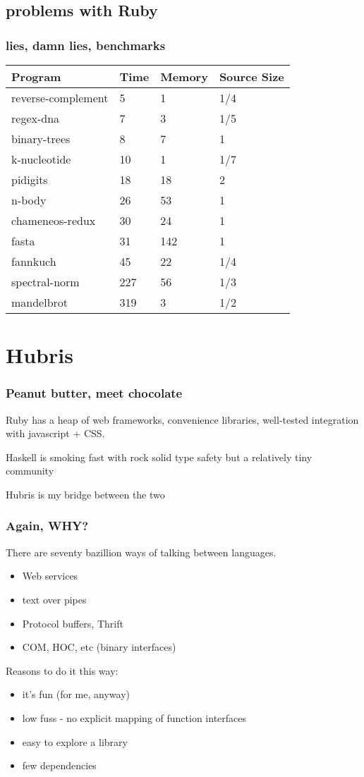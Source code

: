 \documentclass{beamer}
\begin{document}
\subsection{problems with Ruby}
\begin{frame}
  \frametitle{lies, damn lies, benchmarks}
  \begin{tabular}{l l l l}
    Program &	        Time	&Memory &	Source Size\\ \hline
    reverse-complement	&5	&1	&1/4\\
    regex-dna	        &7	&3	&1/5\\
    binary-trees	        &8	&7	&1	\\
    k-nucleotide	        &10	&1	&1/7	\\
    pidigits	        &18	&18	&2	\\
    n-body	        &26	&53	&1	\\
    chameneos-redux	&30	&24	&1	\\
    fasta	                &31	&142	&1	\\
    fannkuch	        &45	&22	&1/4	\\
    spectral-norm	        &227	&56	&1/3	\\
    mandelbrot	        &319	&3	&1/2\\
  \end{tabular}
\end{frame}



\section{Hubris}
\begin{frame}
\frametitle{Peanut butter, meet chocolate}
Ruby has a heap of web frameworks, convenience libraries, well-tested
integration with javascript + CSS.

\setlength\parskip{0.25in}

Haskell is smoking fast with rock solid type safety but a relatively tiny
community

Hubris is my bridge between the two
\end{frame}

\begin{frame}
\frametitle{Again, WHY?}
There are seventy bazillion ways of talking between languages.
 \begin{itemize}
  \item Web services
  \item text over pipes
  \item Protocol buffers, Thrift
  \item COM, HOC, etc (binary interfaces)
 \end{itemize}

Reasons to do it this way:
 \begin{itemize}
   \item it's fun (for me, anyway)
   \item low fuss - no explicit mapping of function interfaces
   \item easy to explore a library
   \item few dependencies
 \end{itemize}
\end{frame}
\end{document}

